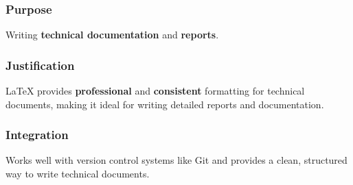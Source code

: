 \documentclass[a4paper, 11pt]{article}
\begin{document}
\subsubsection{Purpose}
Writing \textbf{technical documentation} and \textbf{reports}.

\subsubsection{Justification}
LaTeX provides \textbf{professional} and \textbf{consistent} formatting for technical documents, making it ideal for writing detailed reports and documentation.

\subsubsection{Integration}
Works well with version control systems like Git and provides a clean, structured way to write technical documents.
\end{document}
